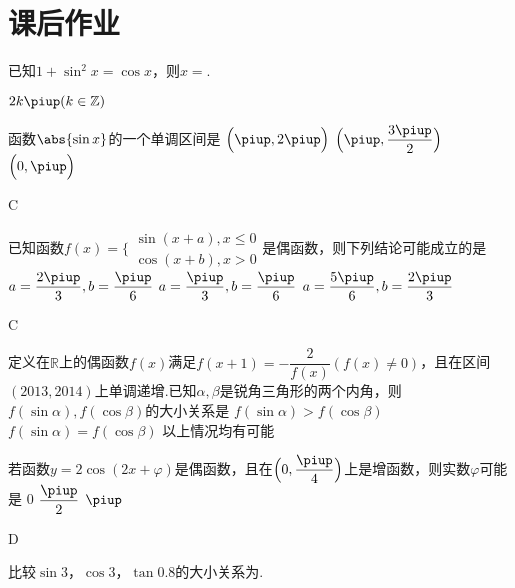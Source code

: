 \newpage
\section{课后作业}
  \begin{exercise}
    \item%
      已知$1+\sin^2x=\cos x$，则$x=$\tk.
      \begin{answer}
        $2k\piup(k\in\mathbb{Z})$
      \end{answer}
    \item%
      函数$\abs{\sin x}$的一个单调区间是\xz
        {$\Bigl(\piup,2\piup\Bigr)$}
        {$\Bigl(\piup,\dfrac{3\piup}2\Bigr)$}
        {$\Bigl(0,\piup\Bigr)$}
      \begin{answer}
        C
      \end{answer}
    \item%
       已知函数$f(x)=\Bigg\{\begin{aligned}
      \sin(x+a),x\le 0\\\cos (x+b),x>0
      \end{aligned}$是偶函数，则下列结论可能成立的是\xz
        {$ a=\dfrac{2\piup}{3},b=\dfrac{\piup}{6}$}
        {$a=\dfrac{\piup}{3},b=\dfrac{\piup}{6} $}
        {$ a=\dfrac{5\piup}{6},b=\dfrac{2\piup}{3}$}
      \begin{answer}
        C
      \end{answer}
    \item%
      定义在$\mathbb{R}$上的偶函数$f(x)$满足$f(x+1)=-\dfrac2{f(x)}(f(x)\neq0)$，且在区间$(2013,2014)$上单调递增.已知$\alpha,\beta$是锐角三角形的两个内角，则$f(\sin\alpha),f(\cos\beta)$的大小关系是\xz
        {$f(\sin\alpha)>f(\cos\beta)$}
        {$f(\sin\alpha)=f(\cos\beta)$}
        {以上情况均有可能}
    \item%
      若函数$y=2\cos(2x+\varphi)$是偶函数，且在$\Bigl(0,\dfrac{\piup}4\Bigr)$上是增函数，则实数$\varphi$可能是\xz
        {0}
        {{$\dfrac{\piup}2$}}
        {$\piup$}
      \begin{answer}
        D
      \end{answer}
    \item%
      比较$\sin 3$，$\cos 3$，$\tan 0.8$的大小关系为\tk.

\end{exercise}
